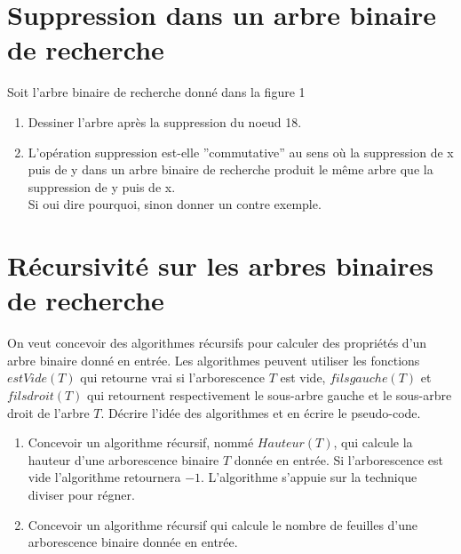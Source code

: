 \documentclass{article}[12pt]
\begin{document}
\section*{Suppression dans un arbre binaire de recherche}
Soit l’arbre binaire de recherche donné dans la figure 1
\begin{enumerate}
    \item Dessiner l’arbre après la suppression du noeud 18.
    \item  L’opération suppression est-elle ”commutative” au sens où la suppression de x puis de y dans un arbre binaire de recherche produit le même arbre que la suppression de y puis
de x.\\
Si oui dire pourquoi, sinon donner un contre exemple.
\end{enumerate}


\section*{Récursivité sur les arbres binaires de recherche}
On veut concevoir des algorithmes récursifs pour calculer des propriétés d'un arbre binaire donné en entrée. 
Les algorithmes peuvent utiliser les fonctions $estVide(T)$ qui retourne vrai si l'arborescence $T$ est vide,  $filsgauche(T)$ et $filsdroit(T)$ qui retournent respectivement le sous-arbre gauche et le sous-arbre droit de l'arbre $T$. Décrire l'idée des algorithmes et en écrire le pseudo-code.
\begin{enumerate}			
\item Concevoir un algorithme récursif, nommé $Hauteur(T)$, qui calcule la hauteur d'une arborescence binaire $T$ donnée en entrée. Si l'arborescence est vide l'algorithme retournera $-1$. L'algorithme s'appuie sur la technique diviser pour régner. 


			
\item Concevoir un algorithme récursif qui calcule le nombre de feuilles d'une arborescence binaire donnée en entrée. 
	


\end{enumerate}
\end{document}
